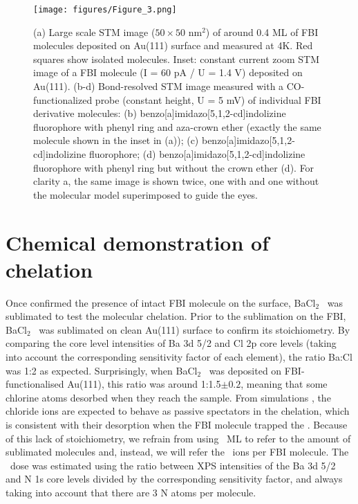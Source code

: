 \documentclass[aps,prl,reprint,longbibliography,superscriptaddress, english]{revtex4-1}
\def\BappCl{BaCl$_2$ }
\begin{document}
\begin{figure}[ht!]
	\texttt{[image: figures/Figure\_3.png]}
	\caption{\label{FIG_BRSTM} 
    (a) Large scale STM image ($50\times50$ nm$^2$) of around 0.4 ML of FBI molecules deposited on Au(111) surface and measured at 4K. Red squares show isolated molecules. Inset: constant current zoom STM image of a FBI molecule (I = 60 pA / U = 1.4 V) deposited on Au(111). (b-d) Bond-resolved STM image measured with a CO-functionalized probe (constant height, U = 5 mV) of individual FBI derivative molecules: (b) benzo[a]imidazo[5,1,2-cd]indolizine fluorophore with phenyl ring and aza-crown ether (exactly the same molecule shown in the inset in (a)); (c)  benzo[a]imidazo[5,1,2-cd]indolizine fluorophore; (d) benzo[a]imidazo[5,1,2-cd]indolizine fluorophore with phenyl ring but without the crown ether (d). For clarity a, the same image is shown twice, one with and one without the molecular model superimposed to guide the eyes.}
\end{figure}

\section{Chemical demonstration of chelation}

Once confirmed the presence of intact FBI molecule on the surface, \BappCl\ was sublimated to test the molecular chelation. Prior to the sublimation on the FBI, \BappCl\ was sublimated on clean Au(111) surface to confirm its stoichiometry. By comparing the core level intensities of Ba 3d 5/2 and Cl 2p core levels (taking into account the corresponding sensitivity factor of each element), the ratio Ba:Cl was 1:2 as expected. Surprisingly, when \BappCl\ was deposited on FBI-functionalised Au(111), this ratio was around 1:1.5$\pm{0.2}$, meaning that some chlorine atoms desorbed when they reach the sample. From simulations \cite{rivilla_fluorescent_2020}, the chloride ions are expected to behave as passive spectators in the chelation, which is consistent with their desorption when the FBI molecule trapped the \Bapp. Because of this lack of stoichiometry, we refrain from using \Bapp\ ML to refer to the amount of sublimated molecules and, instead, we will refer the \Bapp\ ions per FBI molecule. The \Bapp\ dose was estimated using the ratio between XPS intensities of the Ba 3d 5/2 and N 1s core levels divided by the corresponding sensitivity factor, and always taking into account that there are 3 N atoms per molecule.
\end{document}
